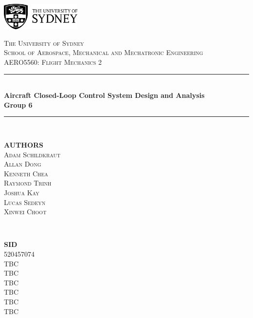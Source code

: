 \documentclass[11pt]{article}
\title{}
\begin{document}
\begin{titlepage}

\newcommand{\HRule}{\rule{\linewidth}{0.5mm}} 
\begin{flushright}
\includegraphics[width=0.3\textwidth]{images/usydNew.png}\\[2cm]
\end{flushright}

\center 


\textsc{\LARGE The University of Sydney}\\[0.75cm]
\textsc{\Large School of Aerospace, Mechanical and Mechatronic Engineering}\\[1cm]

\textsc{\Large AERO5560: Flight Mechanics 2}\\[0.25cm] 


\HRule \\[0.4cm]
{ \huge \bfseries Aircraft Closed-Loop Control System Design and Analysis}\\[0.4cm] 
{ \Large \bfseries Group 6 }\\[0.2cm] 
\HRule \\[1.25cm]
 

\begin{minipage}{0.4\textwidth}
\begin{flushleft} \large
\textsc{\textbf{AUTHORS}}\\

\textsc{Adam Schildkraut}\\
\textsc{Allan Dong}\\
\textsc{Kenneth Chea}\\
\textsc{Raymond Trinh}\\
\textsc{Joshua Kay}\\
\textsc{Lucas Sedeyn}\\
\textsc{Xinwei Choot}\\

\end{flushleft}
\end{minipage}
~
\begin{minipage}{0.4\textwidth}
\begin{flushright} \large\textbf{SID}\\
\textsc{520457074}\\
\textsc{TBC}\\
\textsc{TBC}\\
\textsc{TBC}\\
\textsc{TBC}\\
\textsc{TBC}\\
\textsc{TBC}\\

\end{flushright}
\end{minipage}\\[1.5cm]

\vfill

\end{titlepage}
\newpage
{}
\cfoot{}
\rhead{}
\thispagestyle{fancy}
\pagestyle{fancy}
\setcounter{page}{1}
\end{document}
